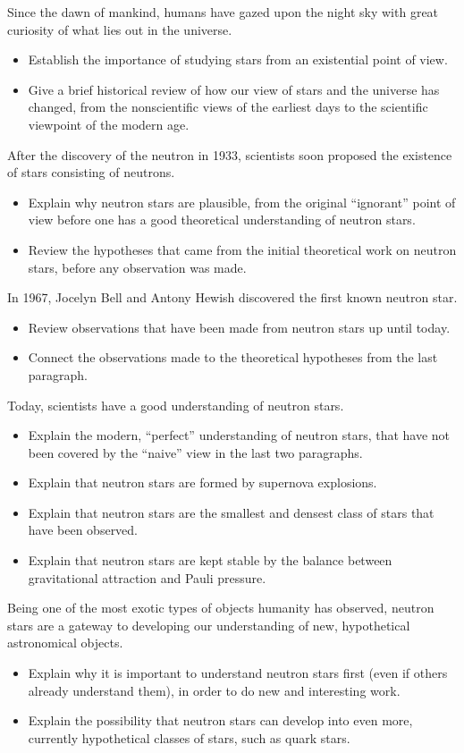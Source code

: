 Since the dawn of mankind, humans have gazed upon the night sky with great curiosity of what lies out in the universe.
\begin{itemize}
\item Establish the importance of studying stars from an existential point of view.
\item Give a brief historical review of how our view of stars and the universe has changed, from the nonscientific views of the earliest days to the scientific viewpoint of the modern age.
\end{itemize}

After the discovery of the neutron in 1933, scientists soon proposed the existence of stars consisting of neutrons.
\begin{itemize}
\item Explain why neutron stars are plausible, from the original ``ignorant'' point of view before one has a good theoretical understanding of neutron stars.
\item Review the hypotheses that came from the initial theoretical work on neutron stars, before any observation was made.
\end{itemize}

In 1967, Jocelyn Bell and Antony Hewish discovered the first known neutron star.
\begin{itemize}
\item Review observations that have been made from neutron stars up until today.
\item Connect the observations made to the theoretical hypotheses from the last paragraph.
\end{itemize}

Today, scientists have a good understanding of neutron stars.
\begin{itemize}
\item Explain the modern, ``perfect'' understanding of neutron stars, that have not been covered by the ``naive'' view in the last two paragraphs.
\item Explain that neutron stars are formed by supernova explosions.
\item Explain that neutron stars are the smallest and densest class of stars that have been observed.
\item Explain that neutron stars are kept stable by the balance between gravitational attraction and Pauli pressure.
\end{itemize}

Being one of the most exotic types of objects humanity has observed, neutron stars are a gateway to developing our understanding of new, hypothetical astronomical objects.
\begin{itemize}
\item Explain why it is important to understand neutron stars first (even if others already understand them), in order to do new and interesting work.
\item Explain the possibility that neutron stars can develop into even more, currently hypothetical classes of stars, such as quark stars.
\end{itemize}

